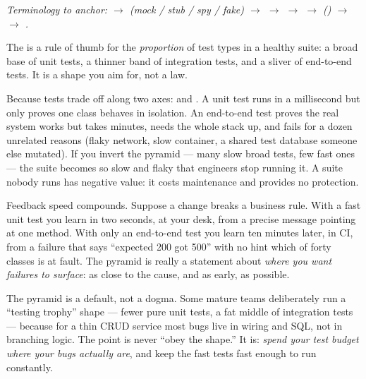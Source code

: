 \begin{center}\small\itshape\color{cInk!70}
Terminology to anchor:  $\rightarrow$  (mock / stub / spy / fake) $\rightarrow$  $\rightarrow$  $\rightarrow$  $\rightarrow$  () $\rightarrow$  $\rightarrow$ .
\end{center}



 The  is a rule of thumb for the \emph{proportion} of test types in a healthy suite: a broad base of unit tests, a thinner band of integration tests, and a sliver of end-to-end tests. It is a shape you aim for, not a law.

 Because tests trade off along two axes:  and . A unit test runs in a millisecond but only proves one class behaves in isolation. An end-to-end test proves the real system works but takes minutes, needs the whole stack up, and fails for a dozen unrelated reasons (flaky network, slow container, a shared test database someone else mutated). If you invert the pyramid --- many slow broad tests, few fast ones --- the suite becomes so slow and flaky that engineers stop running it. A suite nobody runs has negative value: it costs maintenance and provides no protection.

 Feedback speed compounds. Suppose a change breaks a business rule. With a fast unit test you learn in two seconds, at your desk, from a precise message pointing at one method. With only an end-to-end test you learn ten minutes later, in CI, from a failure that says ``expected 200 got 500'' with no hint which of forty classes is at fault. The pyramid is really a statement about \emph{where you want failures to surface}: as close to the cause, and as early, as possible.

\begin{seniornote}
The pyramid is a default, not a dogma. Some mature teams deliberately run a ``testing trophy'' shape --- fewer pure unit tests, a fat middle of integration tests --- because for a thin CRUD service most bugs live in wiring and SQL, not in branching logic. The point is never ``obey the shape.'' It is: \emph{spend your test budget where your bugs actually are}, and keep the fast tests fast enough to run constantly.
\end{seniornote}

